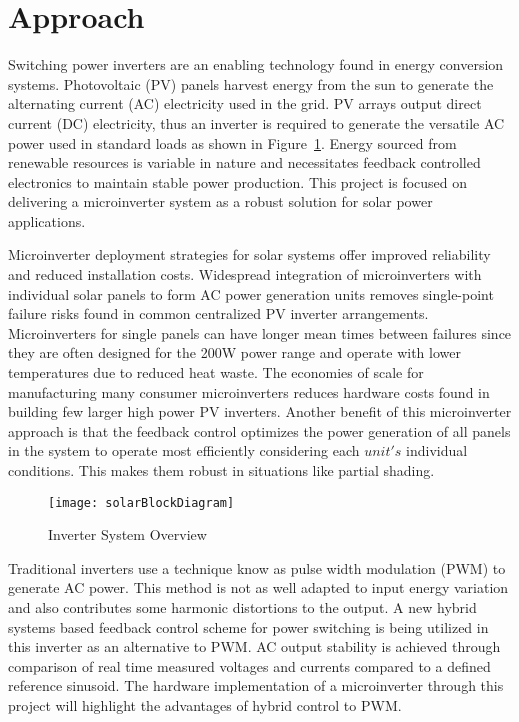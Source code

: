 \section{Approach}
Switching power inverters are an enabling technology found in energy conversion systems. Photovoltaic (PV) panels harvest energy from the sun to generate the alternating current (AC) electricity used in the grid. PV arrays output direct current (DC) electricity, thus an inverter is required to generate the versatile AC power used in standard loads as shown in Figure~\ref{solarBlock}. Energy sourced from renewable resources is variable in nature and necessitates feedback controlled electronics to maintain stable power production.  This project is focused on delivering a microinverter system as a robust solution for solar power applications. 

Microinverter deployment strategies for solar systems offer improved reliability and reduced installation costs. Widespread integration of microinverters with individual solar panels to form AC power generation units removes single-point failure risks found in common centralized PV inverter arrangements. Microinverters for single panels can have longer mean times between failures since they are often designed for the 200W power range and operate with lower temperatures due to reduced heat waste. The economies of scale for manufacturing many consumer microinverters reduces hardware costs found in building few larger high power PV inverters.\cite{microchip} Another benefit of this microinverter approach is that the feedback control optimizes the power generation of all panels in the system to operate most efficiently considering each $unit's$ individual conditions. This makes them robust in situations like partial shading.

\begin{figure}
\centering
\texttt{[image: solarBlockDiagram]}
\caption{Inverter System Overview}
\label{solarBlock}
\end{figure}

Traditional inverters use a technique know as pulse width modulation (PWM) to generate AC power. This method is not as well adapted to input energy variation and also contributes some harmonic distortions to the output. A new hybrid systems based feedback control scheme for power switching is being utilized in this inverter as an alternative to PWM. AC output stability is achieved through comparison of real time measured voltages and currents compared to a defined reference sinusoid.\cite{ricardo} The hardware implementation  of a microinverter through this project will highlight the advantages of hybrid control to PWM.




